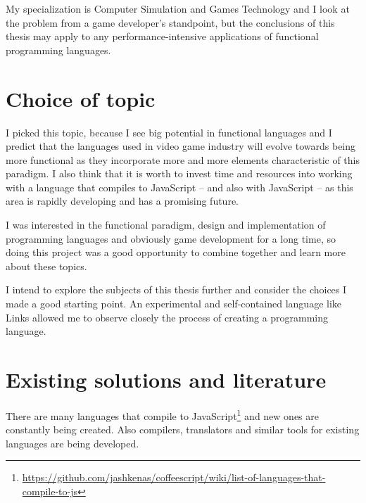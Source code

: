 
My specialization is Computer Simulation and Games Technology and I look at the problem from a game developer's standpoint, but the conclusions of this thesis may apply to any performance-intensive applications of functional programming languages.
\clearpage

\section{Choice of topic}
I picked this topic, because I see big potential in functional languages and I predict that the languages used in video game industry will evolve towards being more functional as they incorporate more and more elements characteristic of this paradigm. I also think that it is worth to invest time and resources into working with a language that compiles to JavaScript -- and also with JavaScript -- as this area is rapidly developing and has a promising future.

I was interested in the functional paradigm, design and implementation of programming languages and obviously game development for a long time, so doing this project was a good opportunity to combine together and learn more about these topics.

I intend to explore the subjects of this thesis further and consider the choices I made a good starting point. An experimental and self-contained language like Links allowed me to observe closely the process of creating a programming language.

\section{Existing solutions and literature}\label{sec:existing}%
There are many languages that compile to JavaScript\footnote{\url{https://github.com/jashkenas/coffeescript/wiki/list-of-languages-that-compile-to-js}} and new ones are constantly being created. Also compilers, translators and similar tools for existing languages are being developed.

